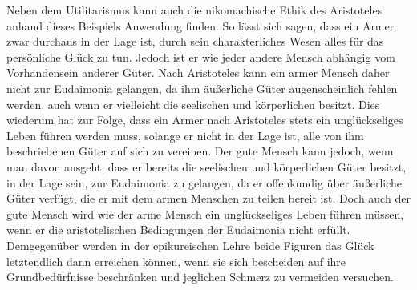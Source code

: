 Neben dem Utilitarismus kann auch die nikomachische Ethik des Aristoteles anhand dieses Beispiels Anwendung finden. 
So lässt sich sagen, dass ein Armer zwar durchaus in der Lage ist, durch sein charakterliches Wesen alles für das persönliche Glück zu tun. 
Jedoch ist er wie jeder andere Mensch abhängig vom Vorhandensein anderer Güter. 
Nach Aristoteles kann ein armer Mensch daher nicht zur Eudaimonia gelangen, da ihm äußerliche Güter augenscheinlich fehlen werden, auch wenn er vielleicht die seelischen und körperlichen besitzt. 
Dies wiederum hat zur Folge, dass ein Armer nach Aristoteles stets ein unglückseliges Leben führen werden muss, solange er nicht in der Lage ist, alle von ihm beschriebenen Güter auf sich zu vereinen. 
Der gute Mensch kann jedoch, wenn man davon ausgeht, dass er bereits die seelischen und körperlichen Güter besitzt, in der Lage sein, zur Eudaimonia zu gelangen, da er offenkundig über äußerliche Güter verfügt, die er mit dem armen Menschen zu teilen bereit ist. 
Doch auch der gute Mensch wird wie der arme Mensch ein unglückseliges Leben führen müssen, wenn er die aristotelischen Bedingungen der Eudaimonia nicht erfüllt. 
Demgegenüber werden in der epikureischen Lehre beide Figuren das Glück letztendlich dann erreichen können, wenn sie sich bescheiden auf ihre Grundbedürfnisse beschränken und jeglichen Schmerz zu vermeiden versuchen.